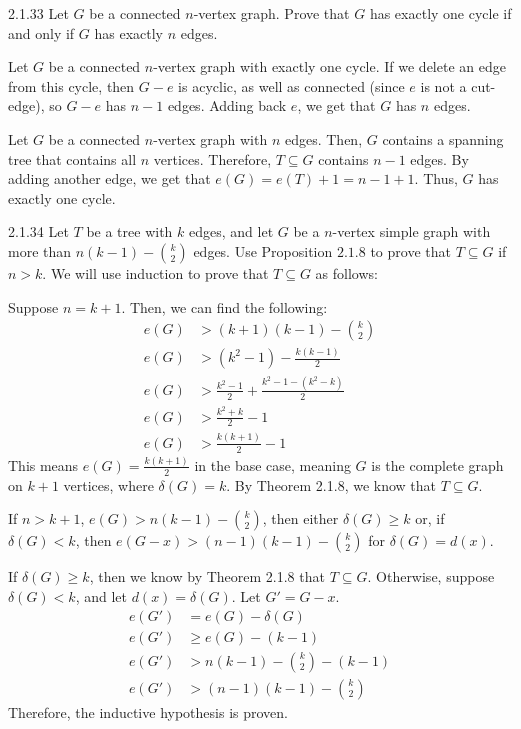\documentclass[9pt]{extarticle}
\begin{document}
  \begin{problem}{2.1.33}
    Let $G$ be a connected $n$-vertex graph. Prove that $G$ has exactly one cycle if and only if $G$ has exactly $n$ edges.
    \tcblower
    \begin{description}[font=\normalfont\scshape]
      \item[($\Rightarrow$)] Let $G$ be a connected $n$-vertex graph with exactly one cycle. If we delete an edge from this cycle, then $G-e$ is acyclic, as well as connected (since $e$ is not a cut-edge), so $G-e$ has $n-1$ edges. Adding back $e$, we get that $G$ has $n$ edges.
      \item[($\Leftarrow$)] Let $G$ be a connected $n$-vertex graph with $n$ edges. Then, $G$ contains a spanning tree that contains all $n$ vertices. Therefore, $T\subseteq G$ contains $n-1$ edges. By adding another edge, we get that $e(G) = e(T) + 1 = n-1+1$. Thus, $G$ has exactly one cycle.
    \end{description}
  \end{problem}
  \begin{problem}{2.1.34}
    Let $T$ be a tree with $k$ edges, and let $G$ be a $n$-vertex simple graph with more than $n(k-1)-{ k \choose 2 }$ edges. Use Proposition $2.1.8$ to prove that $T\subseteq G$ if $n>k$.
    \tcblower
    We will use induction to prove that $T\subseteq G$ as follows:
    \begin{description}[font = \normalfont\scshape]
      \item[Base Case] Suppose $n = k+1$. Then, we can find the following:
        \begin{align*}
          e(G) &> (k+1)(k-1) - {k\choose 2}\\
          e(G) &> (k^2-1) - \frac{k(k-1)}{2}\\
          e(G) &> \frac{k^2 - 1}{2} + \frac{k^2-1 - (k^2-k)}{2} \\
          e(G) &> \frac{k^2 + k}{2} - 1\\
          e(G) &> \frac{k(k+1)}{2} - 1
        \end{align*}
        This means $e(G) = \frac{k(k+1)}{2}$ in the base case, meaning $G$ is the complete graph on $k+1$ vertices, where $\delta(G) = k$. By Theorem 2.1.8, we know that $T\subseteq G$.
      \item[Inductive Hypothesis] If $n > k+1$, $e(G) > n(k-1) - {k\choose 2}$, then either $\delta(G) \geq k$ or, if $\delta(G) < k$, then $e(G-x) > (n-1)(k-1) - {k\choose 2}$ for $\delta(G) = d(x)$.
      \item[Proof] If $\delta(G) \geq k$, then we know by Theorem 2.1.8 that $T\subseteq G$. Otherwise, suppose $\delta(G) < k$, and let $d(x) = \delta(G)$. Let $G' = G-x$.
        \begin{align*}
          e(G') &= e(G) - \delta(G)\\
          e(G') &\geq e(G) - (k-1) \\
          e(G') &> n(k-1) - {k\choose 2} - (k-1) \\
          e(G') &> (n-1)(k-1) - {k\choose 2}
        \end{align*}
        Therefore, the inductive hypothesis is proven.
    \end{description}
  \end{problem}
\end{document}
